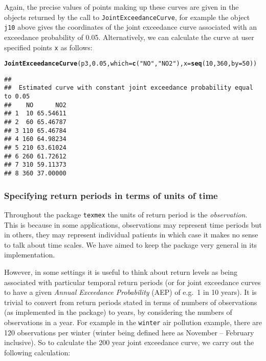 \documentclass[10pt]{article}\usepackage[]{graphicx}\usepackage[]{color}
\makeatletter
\newcommand{\hlnum}[1]{\textcolor[rgb]{0.686,0.059,0.569}{#1}}%
\newcommand{\hlstr}[1]{\textcolor[rgb]{0.192,0.494,0.8}{#1}}%
\newcommand{\hlstd}[1]{\textcolor[rgb]{0.345,0.345,0.345}{#1}}%
\newcommand{\hlkwc}[1]{\textcolor[rgb]{0.333,0.667,0.333}{#1}}%
\newcommand{\hlkwd}[1]{\textcolor[rgb]{0.737,0.353,0.396}{\textbf{#1}}}%
\newenvironment{kframe}{%
 \def\at@end@of@kframe{}%
 \ifinner\ifhmode%
  \def\at@end@of@kframe{\end{minipage}}%
  \begin{minipage}{\columnwidth}%
 \fi\fi%
 \def\FrameCommand##1{\hskip\@totalleftmargin \hskip-\fboxsep
 \colorbox{shadecolor}{##1}\hskip-\fboxsep
     \hskip-\linewidth \hskip-\@totalleftmargin \hskip\columnwidth}%
 \MakeFramed {\advance\hsize-\width
   \@totalleftmargin\z@ \linewidth\hsize
   \@setminipage}}%
 {\par\unskip\endMakeFramed%
 \at@end@of@kframe}
\newenvironment{knitrout}{}{} %
\makeatother
\begin{document}
Again, the precise values of points making up these curves are given in the objects returned by the call to {\tt JointExceedanceCurve}, for example the object {\tt j10} above gives the coordinates of the joint exceedance curve associated with an exceedance probability of 0.05.  Alternatively, we can calculate the curve at user specified points {\tt x} as follows:

\begin{knitrout}
\color{fgcolor}\begin{kframe}
\begin{alltt}
\hlkwd{JointExceedanceCurve}\hlstd{(p3,}\hlnum{0.05}\hlstd{,}\hlkwc{which}\hlstd{=}\hlkwd{c}\hlstd{(}\hlstr{"NO"}\hlstd{,}\hlstr{"NO2"}\hlstd{),}\hlkwc{x}\hlstd{=}\hlkwd{seq}\hlstd{(}\hlnum{10}\hlstd{,}\hlnum{360}\hlstd{,}\hlkwc{by}\hlstd{=}\hlnum{50}\hlstd{))}
\end{alltt}
\begin{verbatim}
## 
##  Estimated curve with constant joint exceedance probability equal to 0.05 
##    NO      NO2
## 1  10 65.54611
## 2  60 65.46787
## 3 110 65.46784
## 4 160 64.98234
## 5 210 63.61024
## 6 260 61.72612
## 7 310 59.11373
## 8 360 37.00000
\end{verbatim}
\end{kframe}
\end{knitrout}

\subsubsection{Specifying return periods in terms of units of time}

Throughout the package {\tt texmex} the units of return period is the {\it observation}.  This is because in some applications, observations may represent time periods but in others, they may represent individual patients in which case it makes no sense to talk about time scales.  We have aimed to keep the package very general in its implementation.

However, in some settings it is useful to think about return levels as being associated with particular temporal return periods (or for joint exceedance curves to have a given {\it Annual Exceedance Probability} (AEP) of e.g.\ 1 in 10 years).  It is trivial to convert from return periods stated in terms of numbers of observations (as implemented in the package) to years, by considering the numbers of observations in a year.  For example in the {\tt winter} air pollution example, there are 120 observations per winter (winter being defined here as November -- February inclusive).  So to calculate the 200 year joint exceedance curve, we carry out the following calculation:
\end{document}
